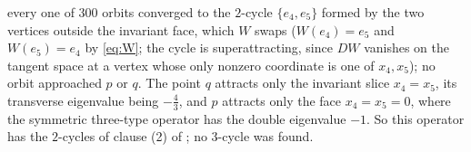 every one of $300$ orbits converged to the $2$-cycle $\{e_4,e_5\}$ formed by the two vertices outside the invariant face, which $W$ swaps ($W(e_4)=e_5$ and $W(e_5)=e_4$ by \eqref{eq:W}; the cycle is superattracting, since $DW$ vanishes on the tangent space at a vertex whose only nonzero coordinate is one of $x_4,x_5$); no orbit approached $p$ or $q$. The point $q$ attracts only the invariant slice $x_4=x_5$, its transverse eigenvalue being $-\frac43$, and $p$ attracts only the face $x_4=x_5=0$, where the symmetric three-type operator has the double eigenvalue $-1$. So this operator has the $2$-cycles of clause (2) of ; no $3$-cycle was found.
